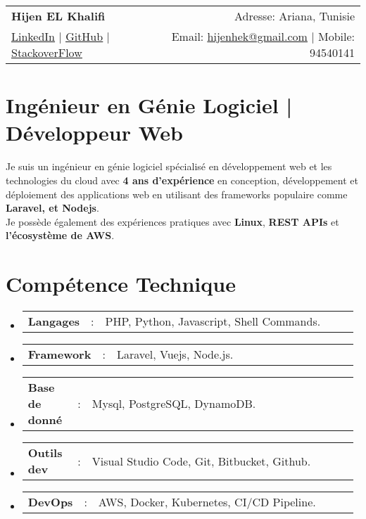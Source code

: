 \documentclass[a4paper,11pt]{article}
\newcommand{\resumeSectionType}[3]{
  \item\begin{tabular*}{0.96\textwidth}[t]{
    p{0.15\linewidth}p{0.02\linewidth}p{0.81\linewidth}
  }
    \textbf{#1} & #2 & #3
  \end{tabular*}\vspace{-2pt}
}
\newcommand{\resumeHeadingListStart}{
  \begin{itemize}[leftmargin=0.15in, label={}]
}
\newcommand{\resumeHeadingListEnd}{\end{itemize}}
\begin{document}

\begin{tabular*}{\textwidth}{l@{\extracolsep{\fill}}r}
  \textbf{\Huge Hijen EL Khalifi \vspace{2pt}} & %
  Adresse: Ariana, Tunisie \\ %
  \href{https://linkedin.com/in/hijenhek}{\uline{LinkedIn}} $|$ %
  \href{https://github.com/hijenhek}{\uline{GitHub}} $|$ %
  \href{https://stackoverflow.com/users/15861862/hijenhek}{\uline{StackoverFlow}} & %
  Email: \href{mailto:hijenhek@gmail.com}{\uline{hijenhek@gmail.com}} $|$ %
  Mobile: 94540141 \\ %
\end{tabular*}



\section{Ingénieur en Génie Logiciel | Développeur Web }
\small{
Je suis un ingénieur en génie logiciel spécialisé en développement web et les technologies du cloud avec \textbf{4 ans d'expérience} en conception, développement et déploiement des applications web en utilisant des frameworks populaire comme \textbf{Laravel, et Nodejs}. \\
Je possède également des expériences pratiques avec \textbf{Linux}, \textbf{REST APIs} et \textbf{l'écosystème de AWS}.
}



\section{Compétence Technique}
  \resumeHeadingListStart{}
    \resumeSectionType{Langages}{:}{PHP, Python, Javascript, Shell Commands.}
    \resumeSectionType{Framework}{:}{Laravel, Vuejs, Node.js.}
    \resumeSectionType{Base de donné}{:}{Mysql, PostgreSQL, DynamoDB.}
    \resumeSectionType{Outils dev}{:}{Visual Studio Code, Git, Bitbucket, Github.}
    \resumeSectionType{DevOps} {:}{AWS, Docker, Kubernetes, CI/CD Pipeline.}
  \resumeHeadingListEnd{}
\end{document}

